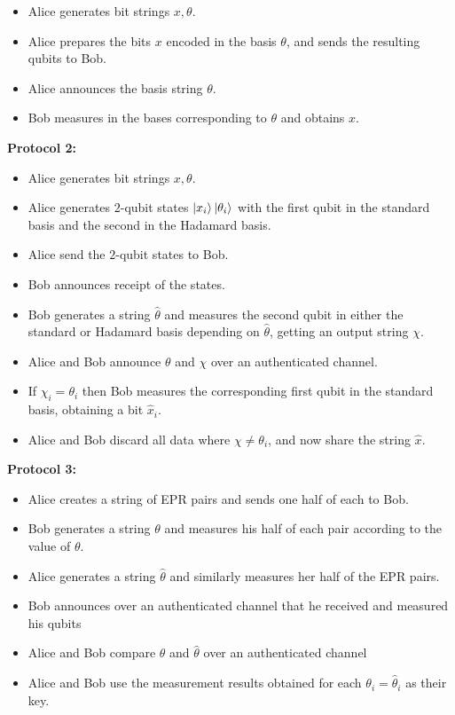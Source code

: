 \documentclass[12pt]{article}
\begin{document}
\begin{enumerate}
\begin{itemize}
\item Alice generates bit strings $x, \theta$.
\item Alice prepares the bits $x$ encoded in the basis $\theta$, and sends the resulting qubits to Bob. 
\item Alice announces the basis string $\theta$.
\item Bob measures in the bases corresponding to $\theta$ and obtains $x$.
\end{itemize}
{\bf Protocol 2:}
\begin{itemize}
\item Alice generates bit strings $x, \theta$.
\item Alice generates $2$-qubit states $\ket{x_i}\ket{\theta_i}$ with the first qubit in the standard basis and the second in the Hadamard basis.
\item Alice send the $2$-qubit states to Bob.
\item Bob announces receipt of the states.
\item Bob generates a string $\hat{\theta}$ and measures the second qubit in either the standard or Hadamard basis depending on $\hat{\theta}$, getting an output string $\chi$.
\item Alice and Bob announce $\theta$ and $\chi$ over an authenticated channel.
\item If $\chi_i=\theta_i$ then Bob measures the corresponding first qubit in the standard basis, obtaining a bit $\hat{x}_i$.
\item Alice and Bob discard all data where $\chi\neq\theta_i$, and now share the string $\hat{x}$.
\end{itemize}
{\bf Protocol 3:}
\begin{itemize}
\item Alice creates a string of EPR pairs and sends one half of each to Bob.
\item Bob generates a string $\theta$ and measures his half of each pair according to the value of $\theta$.
\item Alice generates a string $\hat{\theta}$ and similarly measures her half of the EPR pairs.
\item Bob announces over an authenticated channel that he received and measured his qubits
\item Alice and Bob compare $\theta$ and $\hat{\theta}$ over an authenticated channel
\item Alice and Bob use the measurement results obtained for each $\theta_i = \hat{\theta}_i $ as their key.
\end{itemize}

\end{enumerate}
\end{document}
